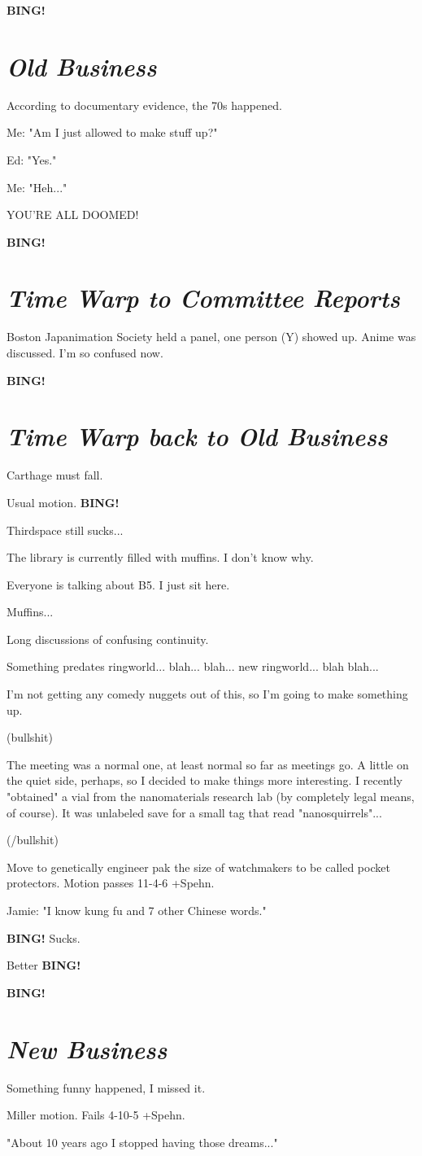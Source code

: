\documentclass[10pt]{article}
\newcommand{\bing}{{\bf BING!} }
\newcommand{\goto}[1]{\bing \vskip 12pt \section*{{\em{#1}}}}
\begin{document}
\goto{Old Business}

According to documentary evidence, the 70s happened.

Me: "Am I just allowed to make stuff up?"

Ed: "Yes."

Me: "Heh..."

YOU'RE ALL DOOMED!

\goto{Time Warp to Committee Reports}

Boston Japanimation Society held a panel, one person (Y) showed up. Anime was discussed. I'm so confused now.

\goto{Time Warp back to Old Business}

Carthage must fall.

Usual motion. \bing

Thirdspace still sucks...

The library is currently filled with muffins. I don't know why.

Everyone is talking about B5. I just sit here.

Muffins...

Long discussions of confusing continuity.

Something predates ringworld... blah... blah... new ringworld... blah blah...

I'm not getting any comedy nuggets out of this, so I'm going to make something up.

(bullshit)

The meeting was a normal one, at least normal so far as meetings go. A little on the quiet side, perhaps, so I decided to make things more interesting. I recently "obtained" a vial from the nanomaterials research lab (by completely legal means, of course). It was unlabeled save for a small tag that read "nanosquirrels"...

(/bullshit)

Move to genetically engineer pak the size of watchmakers to be called pocket protectors. Motion passes 11-4-6 +Spehn.

Jamie: "I know kung fu and 7 other Chinese words."

\bing Sucks.

Better \bing

\goto{New Business}

Something funny happened, I missed it.

Miller motion. Fails 4-10-5 +Spehn.

"About 10 years ago I stopped having those dreams..."
\end{document}
